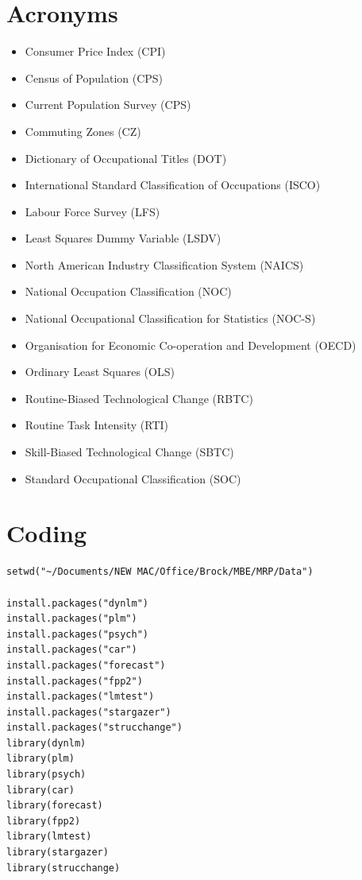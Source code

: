 \documentclass[undefended]{bumrp}
\begin{document}
\begin{appendices}


\chapter{Acronyms}

\begin{itemize}
\item Consumer Price Index (CPI)
\item Census of Population (CPS)
\item Current Population Survey (CPS)
\item Commuting Zones (CZ)
\item Dictionary of Occupational Titles (DOT)
\item International Standard Classification of Occupations (ISCO)
\item Labour Force Survey (LFS)
\item Least Squares Dummy Variable (LSDV)
\item North American Industry Classification System (NAICS) 
\item National Occupation Classification (NOC)
\item National Occupational Classification for Statistics (NOC-S)
\item Organisation for Economic Co-operation and Development (OECD)
\item Ordinary Least Squares (OLS) 
\item Routine-Biased Technological Change (RBTC)
\item Routine Task Intensity (RTI)
\item Skill-Biased Technological Change (SBTC)
\item Standard Occupational Classification (SOC)
\end{itemize}

\chapter{Coding}

\begin{verbatim}
setwd("~/Documents/NEW MAC/Office/Brock/MBE/MRP/Data")

install.packages("dynlm")
install.packages("plm")
install.packages("psych")
install.packages("car")
install.packages("forecast")
install.packages("fpp2")
install.packages("lmtest")
install.packages("stargazer")
install.packages("strucchange")
library(dynlm)
library(plm)
library(psych)
library(car)
library(forecast)
library(fpp2)
library(lmtest)
library(stargazer)
library(strucchange)


\end{verbatim}
\end{appendices}
\end{document}
